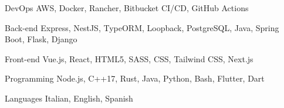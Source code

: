 
\begin{cvskills}

	\cvskill
	{DevOps} %
	{AWS, Docker, Rancher, Bitbucket CI/CD, GitHub Actions} %

	\cvskill
	{Back-end} %
	{Express, NestJS, TypeORM, Loopback, PostgreSQL, Java, Spring Boot, Flask, Django} %

	\cvskill
	{Front-end} %
	{Vue.js, React, HTML5, SASS, CSS, Tailwind CSS, Next.js} %

	\cvskill
	{Programming} %
	{Node.js, C++17, Rust, Java, Python, Bash, Flutter, Dart} %

	\cvskill
	{Languages} %
	{Italian, English, Spanish} %

\end{cvskills}
